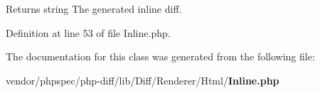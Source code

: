 \begin{DoxyReturn}{Returns}
string The generated inline diff. 
\end{DoxyReturn}


Definition at line 53 of file Inline.\+php.



The documentation for this class was generated from the following file\+:\begin{DoxyCompactItemize}
\item 
vendor/phpspec/php-\/diff/lib/\+Diff/\+Renderer/\+Html/{\bf Inline.\+php}\end{DoxyCompactItemize}
